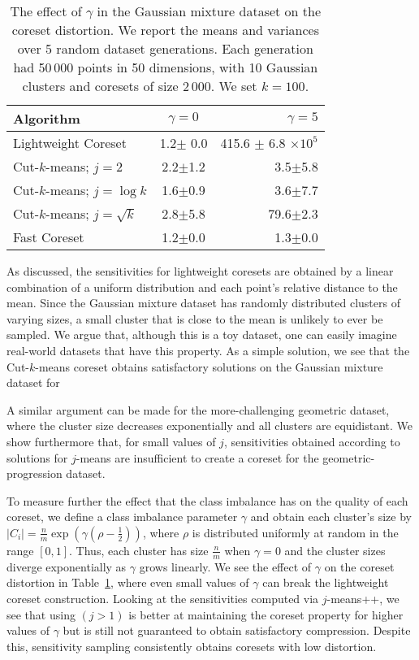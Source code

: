 \begin{table}[htbp]
    \label{tbl:class-imbalance}
    \centering
    \begin{tabular}{lcr}
        Algorithm & $\gamma = 0$ & $\gamma = 5$ \\
        \hline
        Lightweight Coreset & 1.2$\pm$ 0.0 & 415.6 $\pm$ 6.8 $\times 10^5$ \\
        Cut-$k$-means; $j=2$ & 2.2$\pm$1.2 & 3.5$\pm$5.8 \\
        Cut-$k$-means; $j=\log k$ & 1.6$\pm$0.9 & 3.6$\pm$7.7 \\
        Cut-$k$-means; $j=\sqrt{k}$ & 2.8$\pm$5.8 & 79.6$\pm$2.3 \\
        Fast Coreset & 1.2$\pm$0.0 & 1.3$\pm$0.0
    \end{tabular}
    \caption{The effect of $\gamma$ in the Gaussian mixture dataset on the coreset distortion. We report the means and variances over 5 random dataset generations.
    Each generation had 50\,000 points in 50 dimensions, with 10 Gaussian clusters and coresets of size 2\,000. We set $k=100$.}
\end{table}

As discussed, the sensitivities for lightweight coresets are obtained by a linear combination of a uniform distribution and each point's relative
distance to the mean. Since the Gaussian mixture dataset has randomly distributed clusters of varying sizes, a small cluster that is close to the mean is unlikely
to ever be sampled. We argue that, although this is a toy dataset, one can easily imagine real-world datasets that have this property. 
As a simple solution, we see
that the Cut-$k$-means coreset obtains satisfactory solutions on the Gaussian mixture dataset for 

A similar argument can be made for the more-challenging geometric dataset, where the cluster size decreases exponentially and all clusters are equidistant.
We show furthermore that, for small values of $j$, sensitivities obtained according to
solutions for $j$-means are insufficient to create a coreset for the geometric-progression dataset.

To measure further the effect that the class imbalance has on the quality of each coreset, we define a class imbalance parameter $\gamma$ and obtain each
cluster's size by $|C_i| = \frac{n}{m} \exp \left( \gamma(\rho - \frac{1}{2}) \right)$, where $\rho$ is distributed uniformly at random in the range $[0, 1]$.
Thus, each cluster has size $\frac{n}{m}$ when $\gamma = 0$ and the cluster sizes diverge exponentially as $\gamma$ grows linearly. We see the effect of $\gamma$ on the coreset
distortion in Table~\ref{tbl:class-imbalance}, where even small values of $\gamma$ can break the lightweight coreset construction. Looking at the
sensitivities computed via $j$-means++, we see that using $(j>1)$ is better at maintaining the coreset property for higher values of $\gamma$ but is still not guaranteed
to obtain satisfactory compression. Despite this, sensitivity sampling consistently obtains coresets with low distortion. 

